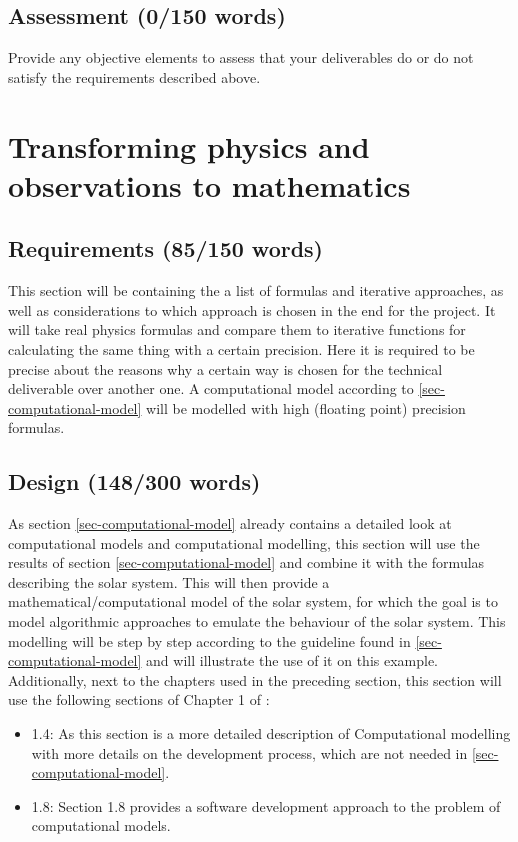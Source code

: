 \documentclass[conference,compsoc]{IEEEtran}
\begin{document}
\subsection{Assessment (0/150 words)}
Provide any objective elements to assess that your deliverables do or do not satisfy the requirements described above. 


\section{Transforming physics and observations to mathematics}
\label{sec-modeling}
\subsection{Requirements (85/150 words)}
This section will be containing the a list of formulas and iterative approaches, as well as considerations to which approach is chosen in the end for the project. It will take real physics formulas and compare them to iterative functions for calculating the same thing with a certain precision. Here it is required to be precise about the reasons why a certain way is chosen for the technical deliverable over another one. A computational model according to \ref{sec-computational-model} will be modelled with high (floating point) precision formulas.
\subsection{Design (148/300 words)}
As section \ref{sec-computational-model} already contains a detailed look at computational models and computational modelling, this section will use the results of section \ref{sec-computational-model} and combine it with the formulas describing the solar system. This will then provide a mathematical/computational model of the solar system, for which the goal is to model algorithmic approaches to emulate the behaviour of the solar system. This modelling will be step by step according to the guideline found in \ref{sec-computational-model} and will illustrate the use of it on this example. \\
Additionally, next to the chapters used in the preceding section, this section will use the following sections of Chapter 1 of \cite{ComputationalModelsIntroduction}:
\begin{itemize}
	\item 1.4: As this section is a more detailed description of Computational modelling with more details on the development process, which are not needed in \ref{sec-computational-model}.
	\item 1.8: Section 1.8 provides a software development approach to the problem of computational models.
\end{itemize} 
\end{document}
